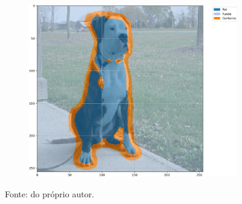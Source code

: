 \begin{figure}[H]
\begin{subfigure}[t]{0.32\textwidth}
         \label{results:fig:semantic:2.2}
     \end{subfigure}%
     ~ 
    \begin{subfigure}[t]{0.32\textwidth}
         \centering
         \includegraphics[width=1\linewidth]{recursos/imagens/results/max_miou_unet500_image_2_overlayed_segmentation.png}
         \label{results:fig:semantic:2.3}
     \end{subfigure}%

    Fonte: do próprio autor.
\end{figure}

